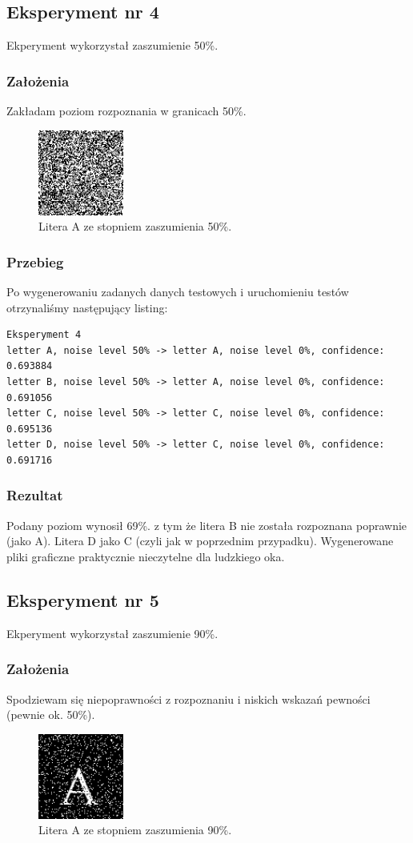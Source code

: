 \documentclass[12pt]{article}
\begin{document}
\subsection{Eksperyment nr 4}
Ekperyment wykorzystał zaszumienie 50\%.
\subsubsection{Założenia}
Zakładam poziom rozpoznania w granicach 50\%.
\begin{figure}[h]
    \centering
    \includegraphics[width=0.25\textwidth]{A_50.png}
    \caption{Litera A ze stopniem zaszumienia 50\%.}
    \label{fig:A_50}
\end{figure}
\subsubsection{Przebieg}
Po wygenerowaniu zadanych danych testowych i uruchomieniu testów otrzynaliśmy następujący listing:
\begin{verbatim}
Eksperyment 4
letter A, noise level 50% -> letter A, noise level 0%, confidence: 0.693884
letter B, noise level 50% -> letter A, noise level 0%, confidence: 0.691056
letter C, noise level 50% -> letter C, noise level 0%, confidence: 0.695136
letter D, noise level 50% -> letter C, noise level 0%, confidence: 0.691716
\end{verbatim}
\subsubsection{Rezultat}
Podany poziom wynosił 69\%. z tym że litera B nie została rozpoznana poprawnie (jako A). Litera D jako C (czyli jak w poprzednim przypadku). Wygenerowane pliki graficzne praktycznie nieczytelne dla ludzkiego oka.

\subsection{Eksperyment nr 5}
Ekperyment wykorzystał zaszumienie 90\%.
\subsubsection{Założenia}
Spodziewam się niepoprawności z rozpoznaniu i niskich wskazań pewności (pewnie ok. 50\%).
\begin{figure}[h]
    \centering
    \includegraphics[width=0.25\textwidth]{A_90.png}
    \caption{Litera A ze stopniem zaszumienia 90\%.}
    \label{fig:A_90}
\end{figure}
\end{document}
